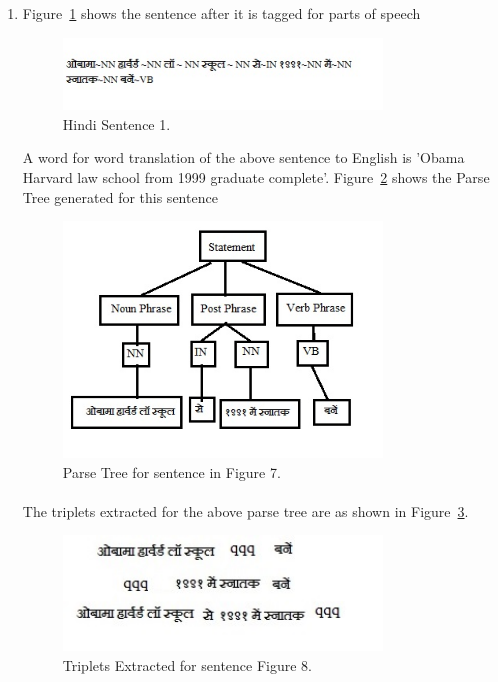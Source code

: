 \begin{enumerate}
\item  Figure~\ref{fig:sentence_testcase1} shows the sentence after it is tagged for parts of speech

\begin{figure}[htb]
\centering
\includegraphics[width=0.8\textwidth]{images/sentence_testcase1.jpg}
\caption{Hindi Sentence 1.} 
\label{fig:sentence_testcase1}
\end{figure}

A word for word translation of the above sentence to English is 'Obama Harvard law school from 1999 graduate complete'. Figure~\ref{fig:standalone_testcase} shows the Parse Tree generated for this sentence 

\begin{figure}[htb]
\centering
\includegraphics[width=0.8\textwidth]{images/standalone_testcase.jpg}
\caption{Parse Tree for sentence in Figure 7.} 
\label{fig:standalone_testcase}
\end{figure}

\paragraph{}
The triplets extracted for the above parse tree are as shown in Figure~\ref{fig:triplet_standalone}.

\begin{figure}[htb]
\centering
\includegraphics[width=0.8\textwidth]{images/triplet_standalone.jpg}
\caption{Triplets Extracted for sentence Figure 8.} 
\label{fig:triplet_standalone}
\end{figure}


\end{enumerate}
